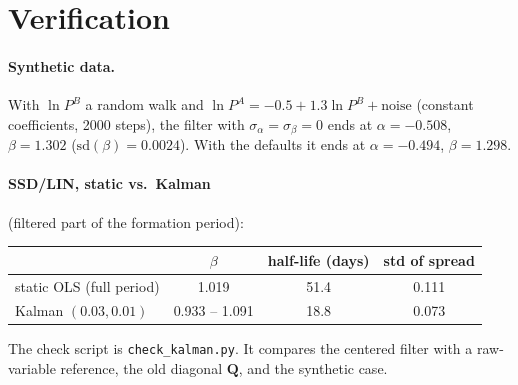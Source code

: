 \documentclass[11pt]{article}
\newcommand{\bs}[1]{\boldsymbol{#1}}
\begin{document}
\section{Verification}

\paragraph{Synthetic data.} With $\ln P^B$ a random walk and
$\ln P^A = -0.5 + 1.3\ln P^B + \text{noise}$ (constant coefficients, 2000
steps), the filter with $\sigma_\alpha = \sigma_\beta = 0$ ends at
$\alpha = -0.508$, $\beta = 1.302$ ($\text{sd}(\beta) = 0.0024$). With the
defaults it ends at $\alpha = -0.494$, $\beta = 1.298$.

\paragraph{SSD/LIN, static vs.\ Kalman} (filtered part of the formation period):
\begin{center}
\begin{tabular}{lccc}
    \toprule
    & $\beta$ & half-life (days) & std of spread \\
    \midrule
    static OLS (full period) & 1.019 & 51.4 & 0.111 \\
    Kalman $(0.03, 0.01)$ & 0.933 -- 1.091 & 18.8 & 0.073 \\
    \bottomrule
\end{tabular}
\end{center}

The check script is \texttt{check\_kalman.py}. It compares the centered filter
with a raw-variable reference, the old diagonal $\bs{Q}$, and the synthetic
case.
\end{document}
